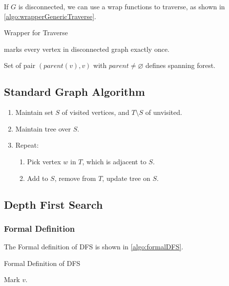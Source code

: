 If $G$ is disconnected, we can use a wrap functions to traverse,
as shown in \cref{algo:wrapperGenericTraverse}.

\begin{algorithm}[H]
    \caption{Wrapper for Traverse}\label{algo:wrapperGenericTraverse}
    \begin{algorithmic}[1]
                    \State{}
                \EndIf
            \EndFor
        \EndProcedure
    \end{algorithmic}
\end{algorithm}

\begin{lemma}
     marks every vertex in disconnected graph exactly once.

    Set of pair $(parent(v),v)$ with $parent \neq \varnothing$ defines spanning forest.
\end{lemma}

\subsection{Standard Graph Algorithm}
\begin{enumerate}[label=Step {\arabic*}, leftmargin=0.5in]
    \item Maintain set $S$ of visited vertices, and $T \setminus S$ of unvisited.
    \item Maintain tree over $S$.
    \item Repeat:
        \begin{enumerate}
            \item Pick vertex $w$ in $T$, which is adjacent to $S$.
            \item Add to $S$, remove from $T$, update tree on $S$.
        \end{enumerate}
\end{enumerate}

\subsection{Depth First Search}
\subsubsection{Formal Definition}
The Formal definition of DFS is shown in \cref{algo:formalDFS}.
\begin{algorithm}[H]
    \caption{Formal Definition of DFS}\label{algo:formalDFS}
    \begin{algorithmic}[1]
            \State Mark $v$.
                    \State{}
                \EndIf
            \EndFor
        \EndProcedure
    \end{algorithmic}
\end{algorithm}

